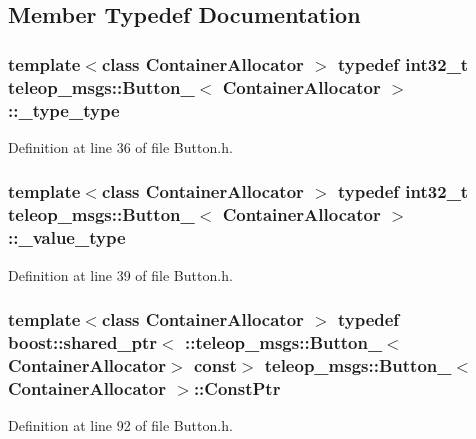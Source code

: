 \subsection{Member Typedef Documentation}
\subsubsection[{\_\-type\_\-type}]{\setlength{\rightskip}{0pt plus 5cm}template$<$class ContainerAllocator $>$ typedef int32\_\-t {\bf teleop\_\-msgs::Button\_\-}$<$ ContainerAllocator $>$::{\bf \_\-type\_\-type}}\label{structteleop__msgs_1_1Button___a53485e95f8ab884534030b3a5fbe749f}


Definition at line 36 of file Button.h.

\subsubsection[{\_\-value\_\-type}]{\setlength{\rightskip}{0pt plus 5cm}template$<$class ContainerAllocator $>$ typedef int32\_\-t {\bf teleop\_\-msgs::Button\_\-}$<$ ContainerAllocator $>$::{\bf \_\-value\_\-type}}\label{structteleop__msgs_1_1Button___a69dd9821814bf9d1b62d3eacd46c2623}


Definition at line 39 of file Button.h.

\subsubsection[{ConstPtr}]{\setlength{\rightskip}{0pt plus 5cm}template$<$class ContainerAllocator $>$ typedef boost::shared\_\-ptr$<$ ::{\bf teleop\_\-msgs::Button\_\-}$<$ContainerAllocator$>$ const$>$ {\bf teleop\_\-msgs::Button\_\-}$<$ ContainerAllocator $>$::{\bf ConstPtr}}\label{structteleop__msgs_1_1Button___a7ab38b0c8f0b011b9ea38fabf0ad93b8}


Definition at line 92 of file Button.h.

